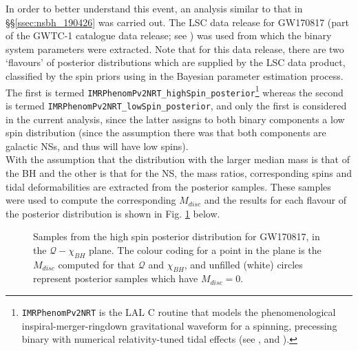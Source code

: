         In order to better understand this event, an analysis similar to that in
        \S\S\ref{ssec:nsbh_190426} was carried out. The LSC data release for GW170817
        (part of the GWTC-1 catalogue data release; see \cite{gwtc1_DR}) was used from
        which the binary system parameters were extracted. Note that for this data
        release, there are two `flavours' of posterior distributions which are supplied
        by the LSC data product, classified by the spin priors using in the Bayesian
        parameter estimation process.  The first is termed
        \texttt{IMRPhenomPv2NRT\_highSpin\_posterior}\footnote
        {
            \texttt{IMRPhenomPv2NRT} is the LAL C routine that models the
            phenomenological inspiral-merger-ringdown gravitational waveform for a
            spinning, precessing binary with numerical relativity-tuned tidal effects
            (see \cite{lalsuite}, and \cite{dietrich_2019}).
        }
        whereas the second is termed \texttt{IMRPhenomPv2NRT\_lowSpin\_posterior}, and
        only the first is considered in the current analysis, since the latter assigns
        to both binary components a low spin distribution (since the assumption there
        was that both components are galactic NSs, and thus will have low spins).\\
        With the assumption that the distribution with the larger median mass is that of
        the BH and the other is that for the NS, the mass ratios, corresponding spins
        and tidal deformabilities are extracted from the posterior samples. These
        samples were used to compute the corresponding $M_{disc}$ and the results for
        each flavour of the posterior distribution is shown in Fig.
        \ref{fig:170817_high} below.

        \begin{figure}[ht]
            \centering
            \def\svgwidth{\linewidth}
            
            \caption[$M_{disc}$ for GW170817's High Spin Posterior Distribution]
            {
                Samples from the high spin posterior distribution for GW170817, in the
                $\mathcal{Q}-\chi_{BH}$ plane. The colour coding for a point in the
                plane is the $M_{disc}$ computed for that $\mathcal{Q}$ and $\chi_{BH}$,
                and unfilled (white) circles represent posterior samples which have
                $M_{disc} = 0$.
            }
            \label{fig:170817_high}
        \end{figure}

